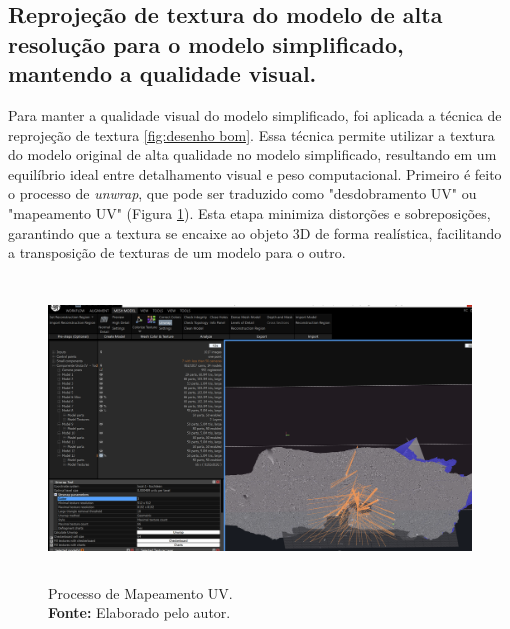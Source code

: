   \subsection{Reprojeção de textura do modelo de alta resolução para o modelo simplificado, mantendo a qualidade visual.} 
  
Para manter a qualidade visual do modelo simplificado, foi aplicada a técnica de reprojeção de textura \ref{fig:desenho bom}. Essa técnica permite utilizar a textura do modelo original de alta qualidade no modelo simplificado, resultando em um equilíbrio ideal entre detalhamento visual e peso computacional. Primeiro é feito o processo de \textit{unwrap}, que pode ser traduzido como "desdobramento UV" ou "mapeamento UV" (Figura \ref{fig:unwrap}). Esta etapa minimiza distorções e sobreposições, garantindo que a textura se encaixe ao objeto 3D de forma realística, facilitando a transposição de texturas de um modelo para o outro. 
\begin{figure}[H]
        \centering
        \includegraphics[height=8cm, keepaspectratio]{img/reality e fotogrametria processo/unwrap.png}
        \caption{Processo de Mapeamento UV. \\
            \textbf{Fonte:} Elaborado pelo autor.}
        \label{fig:unwrap}
\end{figure}

